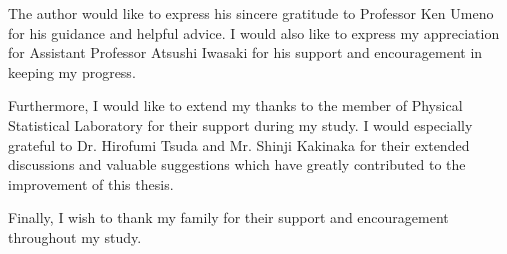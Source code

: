 The author would like to express his sincere gratitude to Professor Ken Umeno for his guidance and helpful advice.
%
I would also like to express my appreciation for Assistant Professor Atsushi Iwasaki for his support and encouragement in keeping my progress.
%
\par
Furthermore, I would like to extend my thanks to the member of Physical Statistical Laboratory for their support during my study. 
%
I would especially grateful to Dr. Hirofumi Tsuda and Mr. Shinji Kakinaka for their extended discussions and valuable suggestions which have greatly contributed to the improvement of this thesis.
%
\par
Finally, I wish to thank my family for their support and encouragement throughout my study.